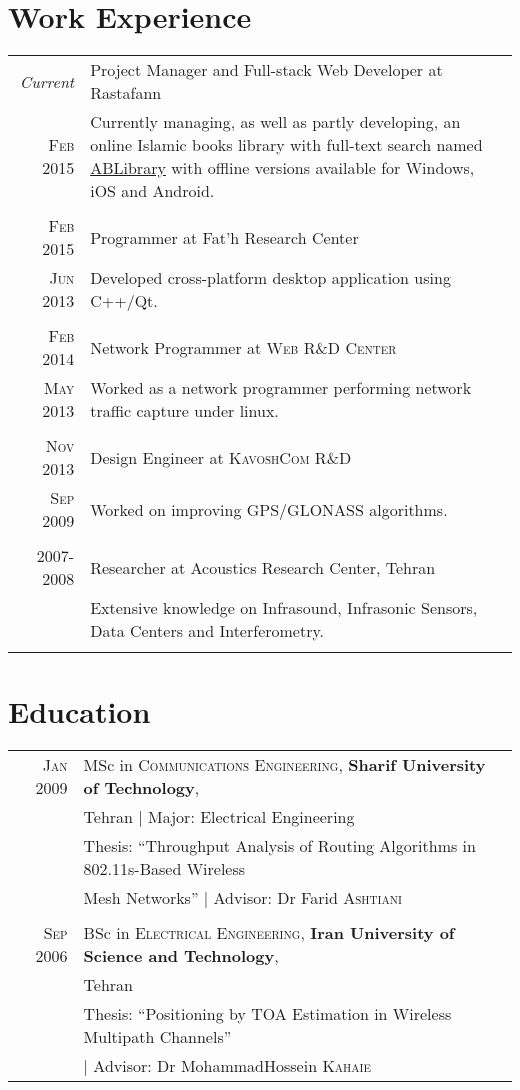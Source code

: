 \documentclass[a4paper,10pt]{article}
\begin{document}
\section{Work Experience}
\begin{tabular}{r|p{11cm}}
\emph{Current} &Project Manager and Full-stack Web Developer at Rastafann\\\textsc{Feb 2015}& \footnotesize{Currently managing, as well as partly developing, an online Islamic books library  with full-text search named \href{https://ablibrary.net}{ABLibrary} with offline versions available for Windows, iOS and Android.}\\\multicolumn{2}{c}{} \\
\textsc{Feb 2015} &Programmer at Fat'h Research Center\\\textsc{Jun 2013}& \footnotesize{Developed cross-platform desktop application using C++/Qt.}\\\multicolumn{2}{c}{} \\
\textsc{Feb 2014} & Network Programmer at \textsc{Web R\&D Center}\\\textsc{May 2013}& \footnotesize{Worked as a network programmer performing network traffic capture under linux.}\\\multicolumn{2}{c}{} \\
 \textsc{Nov 2013} & Design Engineer at \textsc{KavoshCom R\&D} \\\textsc{Sep 2009}&\footnotesize{Worked on improving GPS/GLONASS algorithms.}\\\multicolumn{2}{c}{} \\
\textsc{2007-2008} & Researcher at Acoustics Research Center, Tehran \\&\footnotesize{Extensive knowledge on Infrasound, Infrasonic Sensors, Data Centers and Interferometry.}\\\multicolumn{2}{c}{}
\end{tabular}

\section{Education}
\begin{tabular}{rl}	
 \textsc{Jan} 2009 & MSc in \textsc{Communications Engineering}, \textbf{Sharif University of Technology}, \\
& Tehran | Major: Electrical Engineering\\
& Thesis: ``Throughput Analysis of Routing Algorithms in 802.11s-Based Wireless \\
& Mesh Networks'' | \small Advisor: Dr Farid \textsc{Ashtiani}
\\&\\
\textsc{Sep} 2006 & BSc in \textsc{Electrical Engineering}, \normalsize\textbf{Iran University of Science and Technology}, \\
& \normalsize Tehran\\
& Thesis: ``Positioning by TOA Estimation in Wireless Multipath Channels''\\
& | \small Advisor: Dr MohammadHossein \textsc{Kahaie}
\end{tabular}
\end{document}
